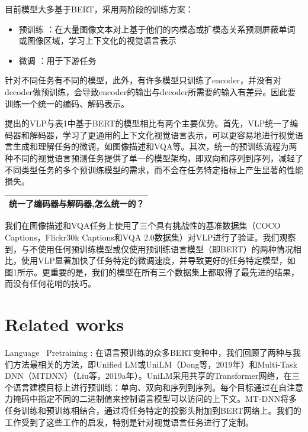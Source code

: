 \documentclass{article}
\begin{document}
\begin{sloppypar}
\begin{itemize}
      \end{itemize}



      目前模型大多基于BERT，采用两阶段的训练方案：
      \begin{itemize}
            \item 预训练 ：在大量图像文本对上基于他们的内模态或扩模态关系预测屏蔽单词或图像区域，学习上下文化的视觉语言表示
            \item 微调   ：用于下游任务
      \end{itemize}


      针对不同任务有不同的模型，此外，有许多模型只训练了encoder，并没有对decoder做预训练，会导致encoder的输出与decoder所需要的输入有差异。因此要训练一个统一的编码、解码表示。


      提出的VLP与表1中基于BERT的模型相比有两个主要优势。首先，VLP统一了编码器和解码器，学习了更通用的上下文化视觉语言表示，可以更容易地进行视觉语言生成和理解任务的微调，如图像描述和VQA等。其次，统一的预训练流程为两种不同的视觉语言预测任务提供了单一的模型架构，即双向和序列到序列，减轻了不同类型任务的多个预训练模型的需求，而不会在任务特定指标上产生显著的性能损失。
      \begin{table}[!htbp]
            \renewcommand\arraystretch{2}

            \centering
            \begin{tabularx}{\textwidth}{|X|}
                  \hline
                  统一了编码器与解码器,怎么统一的？ \\
                  \hline
            \end{tabularx}%

      \end{table}%

      我们在图像描述和VQA任务上使用了三个具有挑战性的基准数据集（COCO Captions，Flickr30k Captions和VQA 2.0数据集）对VLP进行了验证。我们观察到，与不使用任何预训练模型或仅使用预训练语言模型（即BERT）的两种情况相比，使用VLP显著加快了任务特定的微调速度，并导致更好的任务特定模型，如图1所示。更重要的是，我们的模型在所有三个数据集上都取得了最先进的结果，而没有任何花哨的技巧。


      \section{Related works}

      Language  Pretraining : 在语言预训练的众多BERT变种中，我们回顾了两种与我们方法最相关的方法，即Unified LM或UniLM（Dong等，2019年）和Multi-Task DNN（MTDNN）（Liu等，2019a年）。UniLM采用共享的Transformer网络，在三个语言建模目标上进行预训练：单向、双向和序列到序列。每个目标通过在自注意力掩码中指定不同的二进制值来控制语言模型可以访问的上下文。MT-DNN将多任务训练和预训练相结合，通过将任务特定的投影头附加到BERT网络上。我们的工作受到了这些工作的启发，特别是针对视觉语言任务进行了定制。
      \begin{table}[!htbp]
            \renewcommand\arraystretch{2}


\end{table}
\end{sloppypar}
\end{document}
